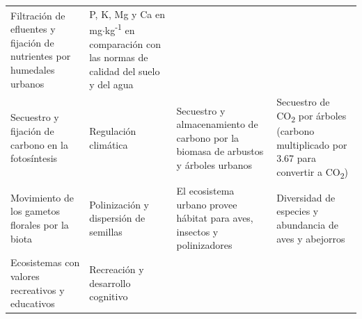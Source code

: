 \documentclass[12pt,a4paper,openany]{book}
\theoremstyle{definition}
\theoremstyle{definition}
\theoremstyle{definition}
\theoremstyle{remark}
\begin{document}
\begin{longtable}[]{@{}llll@{}}
\begin{minipage}[t]{0.19\columnwidth}
Filtración de efluentes y fijación de nutrientes por humedales
urbanos\strut
\end{minipage} & \begin{minipage}[t]{0.22\columnwidth}\raggedright\strut
P, K, Mg y Ca en mg\(\cdot\)kg\textsuperscript{-1} en comparación con
las normas de calidad del suelo y del agua\strut
\end{minipage}\tabularnewline
\begin{minipage}[t]{0.26\columnwidth}\raggedright\strut
Secuestro y fijación de carbono en la fotosíntesis\strut
\end{minipage} & \begin{minipage}[t]{0.22\columnwidth}\raggedright\strut
Regulación climática\strut
\end{minipage} & \begin{minipage}[t]{0.19\columnwidth}\raggedright\strut
Secuestro y almacenamiento de carbono por la biomasa de arbustos y
árboles urbanos\strut
\end{minipage} & \begin{minipage}[t]{0.22\columnwidth}\raggedright\strut
Secuestro de CO\textsubscript{2} por árboles (carbono multiplicado por
3.67 para convertir a CO\textsubscript{2})\strut
\end{minipage}\tabularnewline
\begin{minipage}[t]{0.26\columnwidth}\raggedright\strut
Movimiento de los gametos florales por la biota\strut
\end{minipage} & \begin{minipage}[t]{0.22\columnwidth}\raggedright\strut
Polinización y dispersión de semillas\strut
\end{minipage} & \begin{minipage}[t]{0.19\columnwidth}\raggedright\strut
El ecosistema urbano provee hábitat para aves, insectos y
polinizadores\strut
\end{minipage} & \begin{minipage}[t]{0.22\columnwidth}\raggedright\strut
Diversidad de especies y abundancia de aves y abejorros\strut
\end{minipage}\tabularnewline
\begin{minipage}[t]{0.26\columnwidth}\raggedright\strut
Ecosistemas con valores recreativos y educativos\strut
\end{minipage} & \begin{minipage}[t]{0.22\columnwidth}\raggedright\strut
Recreación y desarrollo cognitivo\strut
\end{minipage} & \begin{minipage}[t]{0.19\columnwidth}\raggedright\strut

\end{minipage}
\end{longtable}
\end{document}
